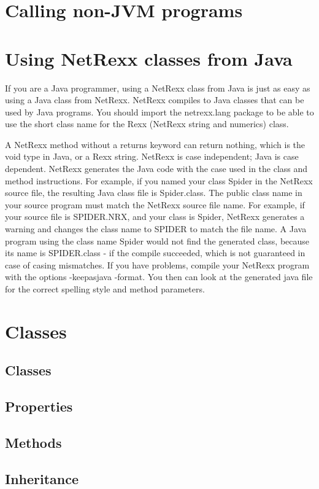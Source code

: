 \documentclass[10pt]{book}
\begin{document}
\chapter{Calling non-JVM programs}

\chapter{Using NetRexx classes from Java}
If you are a Java programmer, using a NetRexx class from Java is just as easy as using a Java class from NetRexx. NetRexx compiles to Java classes that can be used by Java programs.
You should import the netrexx.lang package to be able to use the short
class name for the Rexx (NetRexx string and numerics) class.

A NetRexx method without a returns keyword can return nothing, which is the void type in Java, or a Rexx string. 
NetRexx is case independent; Java is case dependent. NetRexx generates the Java code with the case used in the class and method instructions. For example, if you named your class Spider in the NetRexx source file, the resulting Java class file is Spider.class.
The public class name in your source program must match the NetRexx
source file name. For example, if your source file is SPIDER.NRX, and
your class is Spider, NetRexx generates a warning and changes the
class name to SPIDER to match the file name. A Java program using the
class name Spider would not find the generated class, because its name
is SPIDER.class - if the compile succeeded, which is not guaranteed in
case of casing mismatches.
If you have problems, compile your NetRexx program with the options
-keepasjava -format. You then can look at the generated java file for the correct spelling style and method parameters.

\chapter{Classes}
\section{Classes}
\section{Properties}
\section{Methods}
\section{Inheritance}
\end{document}
